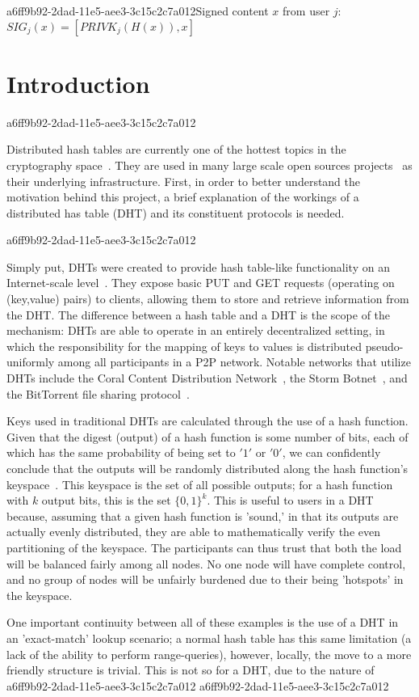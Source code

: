 \documentclass[12pt]{article}
\begin{document}
a6ff9b92-2dad-11e5-aee3-3c15c2c7a012Signed content $x$ from user $j$: $SIG_j(x) = \left[ PRIVK_j( H(x) ), x \right]$

\section{Introduction}
a6ff9b92-2dad-11e5-aee3-3c15c2c7a012\par Distributed hash tables are currently one of the hottest topics in the cryptography space~\cite{Stoica:2001dj,Rowstron:2001ea,Ratnasamy:2001wn}. They are used in many large scale open sources projects~\cite{Freitas:2013tb,Xu:2010vs,Perfitt:2010fh} as their underlying infrastructure. First, in order to better understand the motivation behind this project, a brief explanation of the workings of a distributed has table (DHT) and its constituent protocols is needed.

a6ff9b92-2dad-11e5-aee3-3c15c2c7a012\par Simply put, DHTs were created to provide hash table-like functionality on an Internet-scale level~\cite{Ratnasamy:2001wn}. They expose basic PUT and GET requests (operating on (key,value) pairs) to clients, allowing them to store and retrieve information from the DHT. The difference between a hash table and a DHT is the scope of the mechanism: DHTs are able to operate in an entirely decentralized setting, in which the responsibility for the mapping of keys to values is distributed pseudo-uniformly among all participants in a P2P network. Notable networks that utilize DHTs include the Coral Content Distribution Network~\cite{Freedman:2004vb}, the Storm Botnet~\cite{Holz:2008uk}, and the BitTorrent file sharing protocol~\cite{Cohen:y1_8mBnw}.

\par Keys used in traditional DHTs are calculated through the use of a hash function. Given that the digest (output) of a hash function is some number of bits, each of which has the same probability of being set to $'1'$ or $'0'$, we can confidently conclude that the outputs will be randomly distributed along the hash function's keyspace~. This keyspace is the set of all possible outputs; for a hash function with $k$ output bits, this is the set $\{0,1\}^k$. This is useful to users in a DHT because, assuming that a given hash function is 'sound,' in that its outputs are actually evenly distributed, they are able to mathematically verify the even partitioning of the keyspace. The participants can thus trust that both the load will be balanced fairly among all nodes. No one node will have complete control, and no group of nodes will be unfairly burdened due to their being 'hotspots' in the keyspace.~

\par One important continuity between all of these examples is the use of a DHT in an 'exact-match' lookup scenario; a normal hash table has this same limitation (a lack of the ability to perform range-queries), however, locally, the move to a more friendly structure is trivial. This is not so for a DHT, due to the nature of
a6ff9b92-2dad-11e5-aee3-3c15c2c7a012\printbibliography
a6ff9b92-2dad-11e5-aee3-3c15c2c7a012
\end{document}
